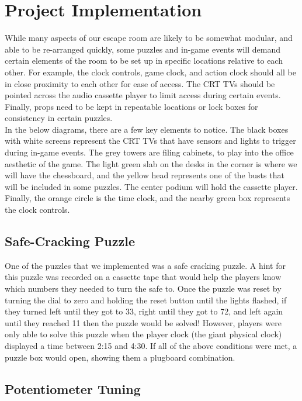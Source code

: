\documentclass[conference]{IEEEtran}
\begin{document}
\section{Project Implementation}
While many aspects of our escape room are likely to be somewhat modular, and able to be re-arranged quickly,
some puzzles and in-game events will demand certain elements of the room to be set up in specific locations relative
to each other. For example, the clock controls, game clock, and action clock should all be in close proximity to each
other for ease of access. The CRT TVs should be pointed across the audio cassette player to limit
access during certain events. Finally, props need to be kept in repeatable
locations or lock boxes for consistency in certain puzzles.
\\
\indent In the below diagrams, there are a few key elements to notice. The black boxes with white screens
represent the CRT TVs that have sensors and lights to trigger during in-game events. The
grey towers are filing cabinets, to play into the office aesthetic of the game. The light green slab on the
desks in the corner is where we will have the chessboard, and the yellow head represents one of the busts
that will be included in some puzzles. The center podium will hold the cassette player. Finally, the orange circle
is the time clock, and the nearby green box represents the clock controls.

\subsection{Safe-Cracking Puzzle} %
One of the puzzles that we implemented was a safe cracking puzzle. A hint for this puzzle was recorded on a cassette tape
that would help the players know which numbers they needed to turn the safe to. Once the puzzle was reset by turning the dial
to zero and holding the reset button until the lights flashed, if they turned left until they got to 33, right until they got to 72,
and left again until they reached 11 then the puzzle would be solved! However, players were only able to solve this puzzle when the
player clock (the giant physical clock) displayed a time between 2:15 and 4:30. If all of the above conditions were met, a puzzle box
would open, showing them a plugboard combination.

\subsection{Potentiometer Tuning} %
\end{document}
